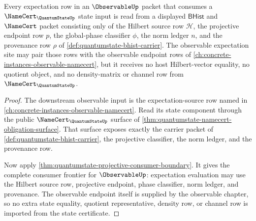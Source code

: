 \begin{theorem}
\label{thm:quantumstate-observable-expectation-readback}
Every expectation row in an $\ObservableUp$ packet that consumes a
$\NameCert_{\QuantumStateUp}$ state input is read from a displayed
$\mathsf{BHist}$ and $\NameCert$ packet consisting only of the Hilbert source
row $\mathcal{H}$, the projective endpoint row $p$, the global-phase
classifier $\phi$, the norm ledger $n$, and the provenance row $\rho$ of
\autoref{def:quantumstate-bhist-carrier}. The observable expectation site may
pair those rows with the observable endpoint rows of
\autoref{ch:concrete-instances-observable-namecert}, but it receives no host
Hilbert-vector equality, no quotient object, and no density-matrix or channel
row from $\NameCert_{\QuantumStateUp}$.
\end{theorem}
\begin{proof}
The downstream observable input is the expectation-source row named in
\autoref{ch:concrete-instances-observable-namecert}. Read its state component
through the public $\NameCert_{\QuantumStateUp}$ surface of
\autoref{thm:quantumstate-namecert-obligation-surface}. That surface exposes
exactly the carrier packet of \autoref{def:quantumstate-bhist-carrier}, the
projective classifier, the norm ledger, and the provenance row.

Now apply \autoref{thm:quantumstate-projective-consumer-boundary}. It gives
the complete consumer frontier for $\ObservableUp$: expectation evaluation may
use the Hilbert source row, projective endpoint, phase classifier, norm ledger,
and provenance. The observable endpoint itself is supplied by the observable
chapter, so no extra state equality, quotient representative, density row, or
channel row is imported from the state certificate.
\end{proof}


